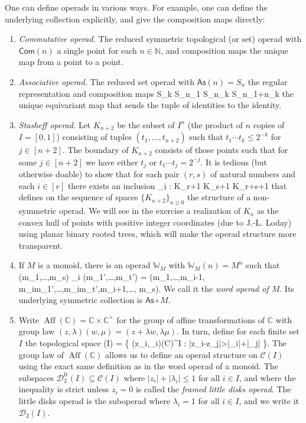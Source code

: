 \documentclass[fleqn, a4paper, twoside]{article}
\makeatletter
\newcommand{\0}{\langle 0\rangle}
\newenvironment{tenumerate}{
 \begin{enumerate}
  \setlength{\itemsep}{0pt}
  \setlength{\parskip}{0pt}
}{\end{enumerate}}
\let\[\@undefined
\DeclareRobustCommand{\[}{\begin{equation}}%
\let\]\@undefined
\DeclareRobustCommand{\]}{\end{equation}}%
\theoremstyle{mytheorem}
\theoremstyle{introthm}
\theoremstyle{mydefinition}
\theoremstyle{mydefinition2}
\theoremstyle{plain} %
\newcommand{\?}{\,?\,}
\newcommand{\NN}{\mathbb N}
\theoremstyle{mytheorem}
\theoremstyle{plain} %
\makeatother
\begin{document}
One can define operads in various ways. For example,
one can define the underlying collection explicitly,
and give the composition maps directly:
\begin{tenumerate}
\item \emph{Commutative operad.} The reduced symmetric topological (or set)
operad with $\mathsf{Com}(n)$ a single point for each
$n\in \NN$, and composition maps the unique
map from a point to a point.
\item \emph{Associative operad.} 
The reduced set operad with
$\mathsf{As}(n) = S_n$
the regular representation and composition maps
\[ S_k \times S_{n_1} \times
\cdots \times S_{n_k} \longrightarrow S_{n_1+\cdots n_k} \]
the unique equivariant map that sends the tuple
of identities to the identity.
\item  \emph{Stasheff operad.}
Let $K_{n+2}$ be the subset of $I^n$ (the
product of $n$ copies of $I=[0,1]$) 
consisting of tuples $(t_1,\ldots,t_{n+2})$
such that $t_1\cdots t_k\leqslant 2^{-k}$
for $j\in [n+2]$. The boundary of 
$K_{n+2}$ consists of those points such
that for some $j\in [n+2]$ we have
either $t_j$ or $t_1\cdots t_j = 2^{-j}$.
It is tedious (but otherwise doable)
to show that for each pair $(r,s)$ of
natural numbers and each $i\in [r]$
there exists an inclusion
\[ \circ_i : K_{r+1} \times K_{s+1} \longrightarrow
 	K_{r+s+1} \] 
that defines on the sequence of
spaces $\{K_{n+2}\}_{n\geqslant 0}$
the structure of a non-symmetric operad.
We will see in the exercise a realization
of $K_n$ as the convex hull of points
with positive integer coordinates
(due to J.-L. Loday)  using planar
binary rooted trees, which will make the
operad structure more transparent.

\item If $M$ is a monoid, there is an
operad $\mathbb W_M$ with $\mathbb{W}_M(n) =
M^n$ such that 
\[(m_1,\ldots,m_s) \circ_i (m_1',\ldots,m_t') = 
 	(m_1,\ldots,m_{i-1}, m_im_1',\ldots,m_im_t',m_{i+1},\ldots, m_s).\] We call it the
 \emph{word operad of $M$}. Its underlying
 symmetric collection is $\mathsf{As}\circ M$. 
 
 \item Write $\operatorname{Aff}(\mathbb C) = \mathbb{C}\times \mathbb{C}^\times$ for the group of affine transformations of
$\mathbb C$ with group law $(z,\lambda)(w,\mu) = (z+\lambda w,\lambda\mu)$. In turn, define for each finite set $I$ the topological space
\[ (I) = \{ (z_i,\lambda_i)\in {}(\mathbb C)^I  : |z_i-z_j|>|\lambda_i|+|\lambda_j| \}.\] 
The group law of $\operatorname{Aff}(\mathbb C)$ allows us to
define an operad structure on $\mathcal{C}(I)$ using the
exact same definition as in the word operad of a monoid. 
The subspaces $\mathcal{D}_2^{\mathrm{fr}}(I)
	\subseteq \mathcal{C}(I)$
where $|z_i|+|\lambda_i|\leqslant 1$ for all $i\in I$, and 
where the inequality is strict unless $z_i=0$ is called
the \emph{framed little disks operad}. The little disks operad
is the suboperad where $\lambda_i = 1$ for all $i\in I$, and 
we write it $\mathcal{D}_2(I)$.


\end{tenumerate}
\end{document}
